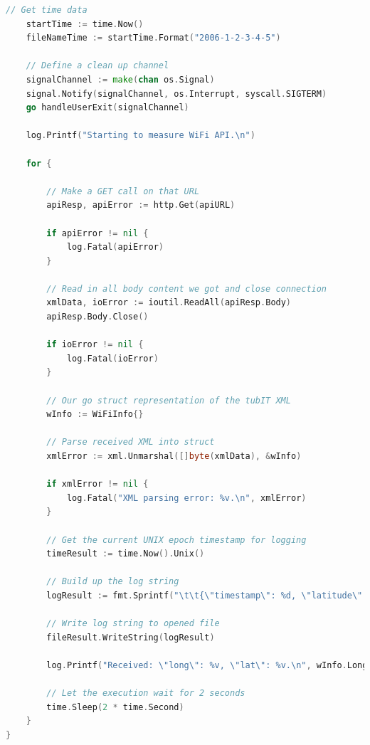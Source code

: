 \documentclass[twoside,11pt,titlepage,a4paper,english,bibliography=totocnumbered,listof=numbered]{scrbook}
\begin{document}
\begin{appendices}
\begin{lstlisting}[language=go]
    // Get time data
    startTime := time.Now()
    fileNameTime := startTime.Format("2006-1-2-3-4-5")

    // Define a clean up channel
    signalChannel := make(chan os.Signal)
    signal.Notify(signalChannel, os.Interrupt, syscall.SIGTERM)
    go handleUserExit(signalChannel)

    log.Printf("Starting to measure WiFi API.\n")

    for {

        // Make a GET call on that URL
        apiResp, apiError := http.Get(apiURL)

        if apiError != nil {
            log.Fatal(apiError)
        }

        // Read in all body content we got and close connection
        xmlData, ioError := ioutil.ReadAll(apiResp.Body)
        apiResp.Body.Close()

        if ioError != nil {
            log.Fatal(ioError)
        }

        // Our go struct representation of the tubIT XML
        wInfo := WiFiInfo{}

        // Parse received XML into struct
        xmlError := xml.Unmarshal([]byte(xmlData), &wInfo)

        if xmlError != nil {
            log.Fatal("XML parsing error: %v.\n", xmlError)
        }

        // Get the current UNIX epoch timestamp for logging
        timeResult := time.Now().Unix()

        // Build up the log string
        logResult := fmt.Sprintf("\t\t{\"timestamp\": %d, \"latitude\": \"%.15f\", \"longitude\": \"%.15f\", \"building\": \"%s\", \"floor\": \"%s\"},\n", timeResult, wInfo.Latitude, wInfo.Longitude, wInfo.Building, wInfo.Floor)

        // Write log string to opened file
        fileResult.WriteString(logResult)

        log.Printf("Received: \"long\": %v, \"lat\": %v.\n", wInfo.Longitude, wInfo.Latitude)

        // Let the execution wait for 2 seconds
        time.Sleep(2 * time.Second)
    }
}
\end{lstlisting}

\end{appendices}
\end{document}
